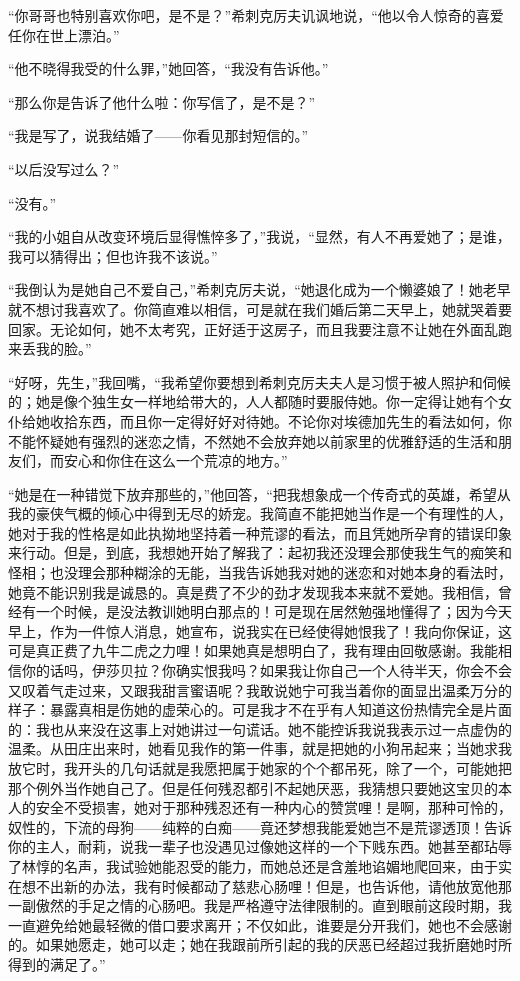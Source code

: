 \par “你哥哥也特别喜欢你吧，是不是？”希刺克厉夫讥讽地说，“他以令人惊奇的喜爱任你在世上漂泊。”
\par “他不晓得我受的什么罪，”她回答，“我没有告诉他。”
\par “那么你是告诉了他什么啦：你写信了，是不是？”
\par “我是写了，说我结婚了——你看见那封短信的。”
\par “以后没写过么？”
\par “没有。”
\par “我的小姐自从改变环境后显得憔悴多了，”我说，“显然，有人不再爱她了；是谁，我可以猜得出；但也许我不该说。”
\par “我倒认为是她自己不爱自己，”希刺克厉夫说，“她退化成为一个懒婆娘了！她老早就不想讨我喜欢了。你简直难以相信，可是就在我们婚后第二天早上，她就哭着要回家。无论如何，她不太考究，正好适于这房子，而且我要注意不让她在外面乱跑来丢我的脸。”
\par “好呀，先生，”我回嘴，“我希望你要想到希刺克厉夫夫人是习惯于被人照护和伺候的；她是像个独生女一样地给带大的，人人都随时要服侍她。你一定得让她有个女仆给她收拾东西，而且你一定得好好对待她。不论你对埃德加先生的看法如何，你不能怀疑她有强烈的迷恋之情，不然她不会放弃她以前家里的优雅舒适的生活和朋友们，而安心和你住在这么一个荒凉的地方。”
\par “她是在一种错觉下放弃那些的，”他回答，“把我想象成一个传奇式的英雄，希望从我的豪侠气概的倾心中得到无尽的娇宠。我简直不能把她当作是一个有理性的人，她对于我的性格是如此执拗地坚持着一种荒谬的看法，而且凭她所孕育的错误印象来行动。但是，到底，我想她开始了解我了：起初我还没理会那使我生气的痴笑和怪相；也没理会那种糊涂的无能，当我告诉她我对她的迷恋和对她本身的看法时，她竟不能识别我是诚恳的。真是费了不少的劲才发现我本来就不爱她。我相信，曾经有一个时候，是没法教训她明白那点的！可是现在居然勉强地懂得了；因为今天早上，作为一件惊人消息，她宣布，说我实在已经使得她恨我了！我向你保证，这可是真正费了九牛二虎之力哩！如果她真是想明白了，我有理由回敬感谢。我能相信你的话吗，伊莎贝拉？你确实恨我吗？如果我让你自己一个人待半天，你会不会又叹着气走过来，又跟我甜言蜜语呢？我敢说她宁可我当着你的面显出温柔万分的样子：暴露真相是伤她的虚荣心的。可是我才不在乎有人知道这份热情完全是片面的：我也从来没在这事上对她讲过一句谎话。她不能控诉我说我表示过一点虚伪的温柔。从田庄出来时，她看见我作的第一件事，就是把她的小狗吊起来；当她求我放它时，我开头的几句话就是我愿把属于她家的个个都吊死，除了一个，可能她把那个例外当作她自己了。但是任何残忍都引不起她厌恶，我猜想只要她这宝贝的本人的安全不受损害，她对于那种残忍还有一种内心的赞赏哩！是啊，那种可怜的，奴性的，下流的母狗——纯粹的白痴——竟还梦想我能爱她岂不是荒谬透顶！告诉你的主人，耐莉，说我一辈子也没遇见过像她这样的一个下贱东西。她甚至都玷辱了林惇的名声，我试验她能忍受的能力，而她总还是含羞地谄媚地爬回来，由于实在想不出新的办法，我有时候都动了慈悲心肠哩！但是，也告诉他，请他放宽他那一副傲然的手足之情的心肠吧。我是严格遵守法律限制的。直到眼前这段时期，我一直避免给她最轻微的借口要求离开；不仅如此，谁要是分开我们，她也不会感谢的。如果她愿走，她可以走；她在我跟前所引起的我的厌恶已经超过我折磨她时所得到的满足了。”
